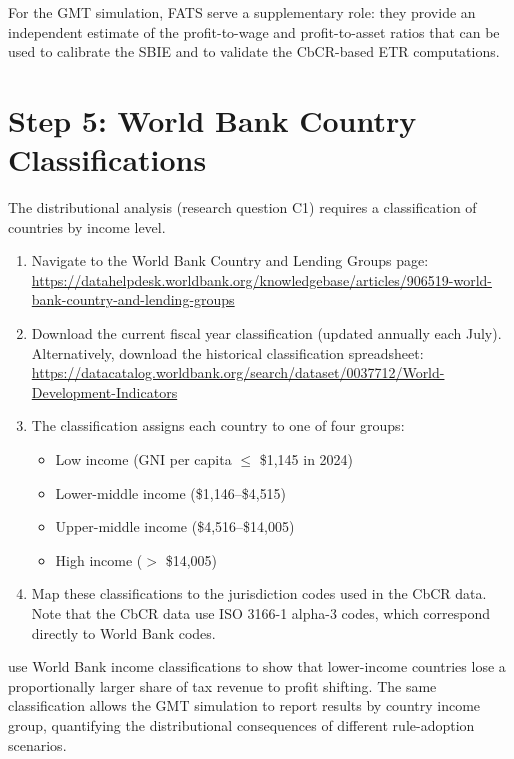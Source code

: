 \documentclass[12pt,a4paper]{article}
\begin{document}
For the GMT simulation, FATS serve a supplementary role: they provide an independent estimate of the profit-to-wage and profit-to-asset ratios that can be used to calibrate the SBIE and to validate the CbCR-based ETR computations.


\section{Step 5: World Bank Country Classifications}\label{sec:worldbank}

The distributional analysis (research question C1) requires a classification of countries by income level.

\begin{enumerate}
\item Navigate to the World Bank Country and Lending Groups page:\\
\url{https://datahelpdesk.worldbank.org/knowledgebase/articles/906519-world-bank-country-and-lending-groups}
\item Download the current fiscal year classification (updated annually each July).
Alternatively, download the historical classification spreadsheet:\\
\url{https://datacatalog.worldbank.org/search/dataset/0037712/World-Development-Indicators}
\item The classification assigns each country to one of four groups:
\begin{itemize}
    \item Low income (GNI per capita $\leq$ \$1{,}145 in 2024)
    \item Lower-middle income (\$1{,}146--\$4{,}515)
    \item Upper-middle income (\$4{,}516--\$14{,}005)
    \item High income ($>$ \$14{,}005)
\end{itemize}
\item Map these classifications to the jurisdiction codes used in the CbCR data.
Note that the CbCR data use ISO 3166-1 alpha-3 codes, which correspond directly to World Bank codes.
\end{enumerate}

\textcite{garcia2024} use World Bank income classifications to show that lower-income countries lose a proportionally larger share of tax revenue to profit shifting.
The same classification allows the GMT simulation to report results by country income group, quantifying the distributional consequences of different rule-adoption scenarios.
\end{document}
